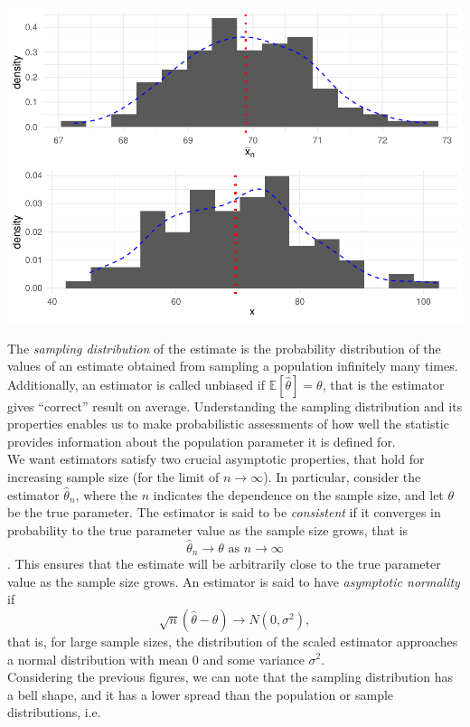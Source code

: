 \documentclass[
]{article}
\begin{document}
\includegraphics{Estimation-and-Confidence-intervals_files/figure-latex/unnamed-chunk-5-1.pdf}

The \emph{sampling distribution} of the estimate is the probability
distribution of the values of an estimate obtained from sampling a
population infinitely many times. Additionally, an estimator is called
unbiased if \(\mathbb{E}[\hat{\theta}] = \theta\), that is the estimator
gives ``correct'' result on average. Understanding the sampling
distribution and its properties enables us to make probabilistic
assessments of how well the statistic provides information about the
population parameter it is defined for.\\
We want estimators satisfy two crucial asymptotic properties, that hold
for increasing sample size (for the limit of \(n \to \infty\)). In
particular, consider the estimator \(\hat{\theta}_n\), where the \(n\)
indicates the dependence on the sample size, and let \(\theta\) be the
true parameter. The estimator is said to be \emph{consistent} if it
converges in probability to the true parameter value as the sample size
grows, that is
\[\hat{\theta}_n \rightarrow \theta \mbox{ as } n \to \infty\]. This
ensures that the estimate will be arbitrarily close to the true
parameter value as the sample size grows. An estimator is said to have
\emph{asymptotic normality} if
\[\sqrt{n}(\hat{\theta} - \theta) \rightarrow N(0, \sigma^2),\] that is,
for large sample sizes, the distribution of the scaled estimator
approaches a normal distribution with mean 0 and some variance
\(\sigma^2\).\\
Considering the previous figures, we can note that the sampling
distribution has a bell shape, and it has a lower spread than the
population or sample distributions, i.e.
\end{document}
